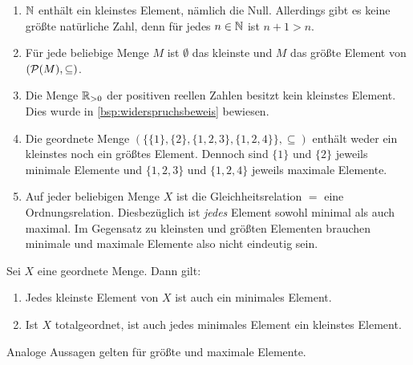 \begin{bsp} \label{bsp:kleinstes}
    \begin{enumerate}
        \item $\mathbb N$ enthält ein kleinstes Element, nämlich die Null. Allerdings gibt es keine größte natürliche Zahl, denn für jedes $n\in \mathbb N$ ist $n+1>n$.
        \item Für jede beliebige Menge $M$ ist $\emptyset$ das kleinste und $M$ das größte Element von $(\mathcal P(M),\subseteq)$.
        \item Die Menge $\mathbb R_{>0}$ der positiven reellen Zahlen besitzt kein kleinstes Element. Dies wurde in \cref{bsp:widerspruchsbeweis} bewiesen.
        \item Die geordnete Menge $(\{\{1\},\{2\},\{1,2,3\},\{1,2,4\}\},\subseteq)$ enthält weder ein kleinstes noch ein größtes Element. Dennoch sind $\{1\}$ und $\{2\}$ jeweils minimale Elemente und $\{1,2,3\}$ und $\{1,2,4\}$ jeweils maximale Elemente.
        \item Auf jeder beliebigen Menge $X$ ist die Gleichheitsrelation $=$ eine Ordnungsrelation. Diesbezüglich ist \emph{jedes} Element sowohl minimal als auch maximal. Im Gegensatz zu kleinsten und größten Elementen brauchen minimale und maximale Elemente also nicht eindeutig sein.
    \end{enumerate}
\end{bsp}


\begin{satz} \label{kleinvsmin}
    Sei $X$ eine geordnete Menge. Dann gilt:
    \begin{enumerate}
        \item Jedes kleinste Element von $X$ ist auch ein minimales Element.
        \item Ist $X$ totalgeordnet, ist auch jedes minimales Element ein kleinstes Element.
    \end{enumerate}
    Analoge Aussagen gelten für größte und maximale Elemente.
\end{satz}


